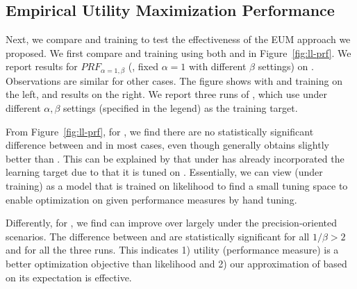 \subsection{Empirical Utility Maximization Performance}
Next, we compare \EUM  and \MLE training to test the effectiveness of the EUM approach we proposed. We first compare \EUM and \MLE training using both \QFI and \QFJ in Figure~\ref{fig:ll-prf}. We report results for $P\!R\!F_{\alpha=1,\beta}$ (\ie, fixed $\alpha=1$ with different $\beta$ settings) on \DQF. Observations are similar for other cases. The figure shows \QFI with \EUM and \MLE training on the left, and \QFJ results on the right. We report three runs of \EUM, which use \PRF under different $\alpha,\beta$  settings (specified in the legend) as the training target.

From Figure~\ref{fig:ll-prf}, for \QFI, we find there are no statistically significant difference between \MLE and \EUM in most cases, even though generally \EUM obtains slightly better \PRF than \MLE. This can be explained by that \QFI under \MLE has already incorporated the \PRF learning target due to that it is tuned on \PRF. Essentially, we can view \QFI (under \MLE training) as a model that is trained on likelihood to find a small tuning space to enable optimization on given performance measures by hand tuning.

Differently, for \QFI, we find \EUM can improve over \MLE largely under the precision-oriented scenarios. The difference between \EUM and \MLE are statistically significant for all $1/\beta>2$ and for all the three \EUM runs. This indicates 1) utility (performance measure) is a better optimization objective than likelihood and 2) our approximation of \PRF based on its expectation is effective. 

